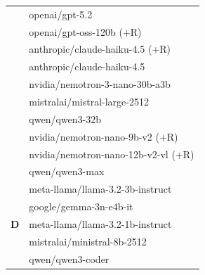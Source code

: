 \begin{table}[h]
\begin{tabular}{cl}
  & openai/gpt-5.2 \\
  & openai/gpt-oss-120b (+R) \\
  & anthropic/claude-haiku-4.5 (+R) \\
  & anthropic/claude-haiku-4.5 \\
  & nvidia/nemotron-3-nano-30b-a3b \\
  & mistralai/mistral-large-2512 \\
  & qwen/qwen3-32b \\
  & nvidia/nemotron-nano-9b-v2 (+R) \\
  & nvidia/nemotron-nano-12b-v2-vl (+R) \\
  & qwen/qwen3-max \\
\hline
\multirow{5}{*}{\textbf{D}}
  & meta-llama/llama-3.2-3b-instruct \\
  & google/gemma-3n-e4b-it \\
  & meta-llama/llama-3.2-1b-instruct \\
  & mistralai/ministral-8b-2512 \\
  & qwen/qwen3-coder \\
\hline
\end{tabular}
\label{table:LLM correctness groups}
\end{table}


